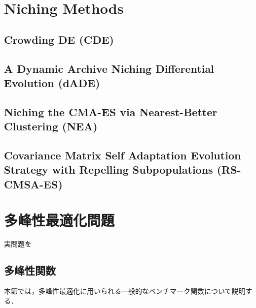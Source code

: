 \documentclass[a4j,11pt]{jarticle}
\begin{document}

\newpage
\section{Niching Methods}
\label{sec:nm}


\subsection{Crowding DE (CDE)}
\label{ss:cde}

\subsection{A Dynamic Archive Niching Differential Evolution (dADE)}
\label{ss:dADE}

\subsection{Niching the CMA-ES via Nearest-Better Clustering (NEA)}
\label{ss:nea}


\subsection{Covariance Matrix Self Adaptation Evolution Strategy with Repelling Subpopulations (RS-CMSA-ES)}
\label{ss:rs-cmsa-es}

\newpage
\section{多峰性最適化問題}
\label{sec:MOP}
実問題を

\subsection{多峰性関数}
\label{ss:benchmark}
本節では，多峰性最適化に用いられる一般的なベンチマーク関数について説明する．
\end{document}

